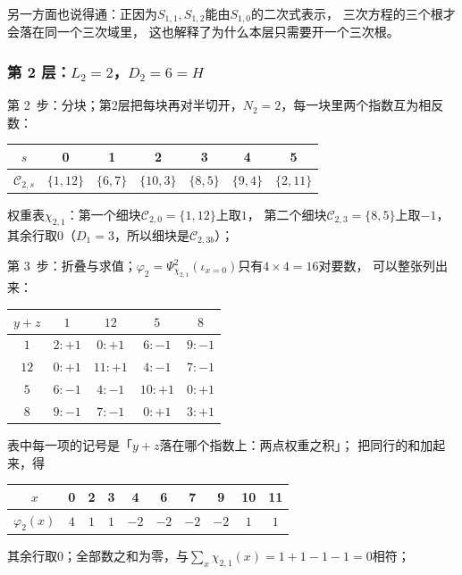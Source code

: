 \documentclass[UTF8,a4paper,11pt]{ctexart}
\begin{document}
另一方面也说得通：正因为$S_{1,1},S_{1,2}$能由$S_{1,0}$的二次式表示，
三次方程的三个根才会落在同一个三次域里，
这也解释了为什么本层只需要开一个三次根。\par

\subsubsection{第 2 层：$L_2=2$，$D_2=6=H$}
第 2~步：分块；第$2$层把每块再对半切开，$N_2=2$，每一块里两个指数互为相反数：
\begin{center}
\begin{tabular}{c|cccccc}
\toprule
$s$ & 0&1&2&3&4&5\\
\midrule
$\mathscr{C}_{2,s}$ & $\{1,12\}$&$\{6,7\}$&$\{10,3\}$&$\{8,5\}$&$\{9,4\}$&$\{2,11\}$\\
\bottomrule
\end{tabular}
\end{center}
权重表$\chi_{2,1}$：第一个细块$\mathscr{C}_{2,0}=\{1,12\}$上取$1$，
第二个细块$\mathscr{C}_{2,3}=\{8,5\}$上取$-1$，
其余行取$0$（$D_1=3$，所以细块是$\mathscr{C}_{2,3b}$）；

第 3~步：折叠与求值；$\varphi_2=\Psi_{\chi_{2,1}}^{2}(\iota_{x=0})$只有$4\times4=16$对要数，
可以整张列出来：
\begin{center}
\begin{tabular}{c|cccc}
\toprule
$y+z$ & $1$ & $12$ & $5$ & $8$ \\
\midrule
$1$ & $2:+1$ & $0:+1$ & $6:-1$ & $9:-1$\\
$12$ & $0:+1$ & $11:+1$ & $4:-1$ & $7:-1$\\
$5$ & $6:-1$ & $4:-1$ & $10:+1$ & $0:+1$\\
$8$ & $9:-1$ & $7:-1$ & $0:+1$ & $3:+1$\\
\bottomrule
\end{tabular}
\end{center}
表中每一项的记号是「$y+z$落在哪个指数上：两点权重之积」；
把同行的和加起来，得
\begin{center}
\begin{tabular}{c|ccccccccc}
\toprule
$x$ & 0&2&3&4&6&7&9&10&11\\
\midrule
$\varphi_2(x)$ & $4$&$1$&$1$&$-2$&$-2$&$-2$&$-2$&$1$&$1$\\
\bottomrule
\end{tabular}
\end{center}
其余行取$0$；全部数之和为零，与$\sum_x\chi_{2,1}(x)=1+1-1-1=0$相符；\par
\end{document}
